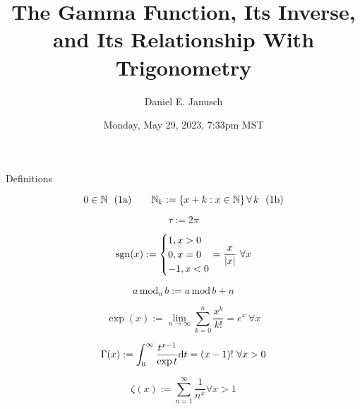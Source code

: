 \documentclass[12pt]{article}
\begin{document}
\title{The Gamma Function, Its Inverse, and Its Relationship With Trigonometry}
\author{Daniel E. Janusch}
\date{Monday, May 29, 2023, 7:33pm MST}
\maketitle

\begin{section}{Definitions}

	\begin{equation}
		0\in\mathbb N~~(1\text a)\hspace{2em}\mathbb N_k:=
		\left\{x+k:x\in\mathbb N\right\}\forall\,k~~(1\text b)
	\end{equation} %

	\vspace{-0.065em}\begin{equation}
		\tau:=2\pi
	\end{equation} %

	\vspace{-0.065em}\begin{equation}
		\text{sgn}(x):=\begin{cases}
			1,x>0\\
			0,x=0\\
			-1,x<0
		\end{cases}\hspace{-1em}=\dfrac x{|x|}~\forall x
	\end{equation} %

	\vspace{-0.065em}\begin{equation}
		a\,\text{mod}_n\,b:=a\,\text{mod}\,b+n
	\end{equation} %

	\vspace{-0.065em}\begin{equation}
		\exp(x):=\lim_{n\to\infty}\sum_{k=0}^n\dfrac{x^k}{k!}=e^x~\forall x
	\end{equation} %

	\vspace{-0.065em}\begin{equation}
		\Gamma(x):=\int_0^\infty\dfrac{t^{x-1}}{\exp t}\text dt=(x-1)!~\forall x>0
	\end{equation} %

	\vspace{-0.065em}\begin{equation}
		\zeta(x):=\sum_{n=1}^\infty\dfrac1{n^x}\forall x>1
	\end{equation} %


\end{section}
\end{document}
